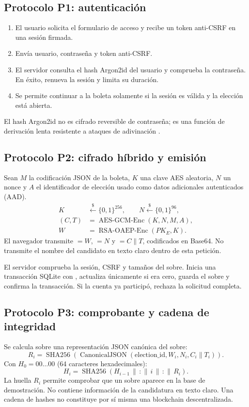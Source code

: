 \subsection{Protocolo P1: autenticación}
\begin{enumerate}
\item El usuario solicita el formulario de acceso y recibe un token anti-CSRF en una sesión firmada.
\item Envía usuario, contraseña y token anti-CSRF.
\item El servidor consulta el hash Argon2id del usuario y comprueba la contraseña. En éxito, renueva la sesión y limita su duración.
\item Se permite continuar a la boleta solamente si la sesión es válida y la elección está abierta.
\end{enumerate}
El hash Argon2id no es cifrado reversible de contraseña; es una función de derivación lenta resistente a ataques de adivinación \cite{owasp}.

\subsection{Protocolo P2: cifrado híbrido y emisión}
Sean $M$ la codificación JSON de la boleta, $K$ una clave AES aleatoria, $N$ un nonce y $A$ el identificador de elección usado como datos adicionales autenticados (AAD).
\begin{align}
K &\xleftarrow{\$}\{0,1\}^{256},\qquad N\xleftarrow{\$}\{0,1\}^{96},\\
(C,T)&=\operatorname{AES\text{-}GCM\text{-}Enc}(K,N,M,A),\\
W &= \operatorname{RSA\text{-}OAEP\text{-}Enc}(PK_{E},K).
\end{align}
El navegador transmite  $=W$,  $=N$ y  $=C\|T$, codificados en Base64. No transmite el nombre del candidato en texto claro dentro de esta petición.

El servidor comprueba la sesión, CSRF y tamaños del sobre. Inicia una transacción SQLite con , actualiza  únicamente si era cero, guarda el sobre y confirma la transacción. Si la cuenta ya participó, rechaza la solicitud completa.

\subsection{Protocolo P3: comprobante y cadena de integridad}
Se calcula sobre una representación JSON canónica del sobre:
\begin{equation}
R_i=\operatorname{SHA256}(\operatorname{CanonicalJSON}(\text{election\_id},W_i,N_i,C_i\|T_i)).
\end{equation}
Con $H_0=00\ldots 00$ (64 caracteres hexadecimales):
\begin{equation}
H_i=\operatorname{SHA256}(H_{i-1}\,\|\,\texttt{:}\,\|\,i\,\|\,\texttt{:}\,\|\,R_i).
\end{equation}
La huella $R_i$ permite comprobar que un sobre aparece en la base de demostración. No contiene información de la candidatura en texto claro. Una cadena de hashes no constituye por sí misma una blockchain descentralizada.

